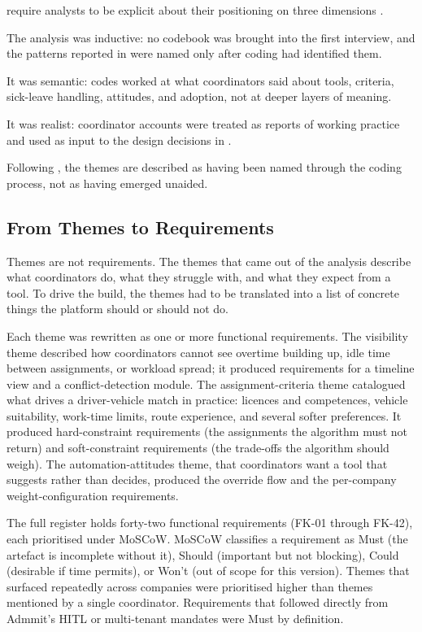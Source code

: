 \textcite{braun2006thematic} require analysts to be explicit about their positioning on three dimensions \parencite[pp.~81--82]{braun2006thematic}.

The analysis was inductive: no codebook was brought into the first interview, and the patterns reported in  were named only after coding had identified them.

It was semantic: codes worked at what coordinators said about tools, criteria, sick-leave handling, attitudes, and adoption, not at deeper layers of meaning.

It was realist: coordinator accounts were treated as reports of working practice and used as input to the design decisions in .

Following \textcite[Table~2]{braun2006thematic}, the themes are described as having been named through the coding process, not as having emerged unaided.

\subsection{From Themes to Requirements}
\label{sec:themes-to-requirements}

Themes are not requirements. The themes that came out of the analysis describe what coordinators do, what they struggle with, and what they expect from a tool. To drive the build, the themes had to be translated into a list of concrete things the platform should or should not do.

Each theme was rewritten as one or more functional requirements. The visibility theme described how coordinators cannot see overtime building up, idle time between assignments, or workload spread; it produced requirements for a timeline view and a conflict-detection module. The assignment-criteria theme catalogued what drives a driver-vehicle match in practice: licences and competences, vehicle suitability, work-time limits, route experience, and several softer preferences. It produced hard-constraint requirements (the assignments the algorithm must not return) and soft-constraint requirements (the trade-offs the algorithm should weigh). The automation-attitudes theme, that coordinators want a tool that suggests rather than decides, produced the override flow and the per-company weight-configuration requirements.

The full register holds forty-two functional requirements (FK-01 through FK-42), each prioritised under MoSCoW. MoSCoW classifies a requirement as Must (the artefact is incomplete without it), Should (important but not blocking), Could (desirable if time permits), or Won't (out of scope for this version). Themes that surfaced repeatedly across companies were prioritised higher than themes mentioned by a single coordinator. Requirements that followed directly from Admmit's HITL or multi-tenant mandates were Must by definition.

